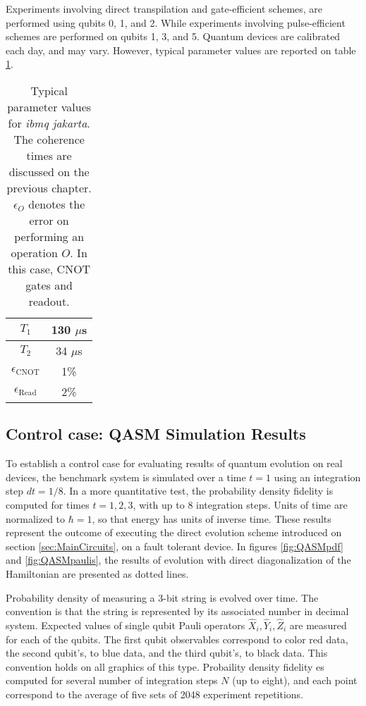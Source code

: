     Experiments involving direct transpilation and gate-efficient schemes, are performed using qubits 0, 1, and 2. While experiments involving pulse-efficient schemes are performed on qubits 1, 3, and 5. Quantum devices are calibrated each day, and may vary. However, typical parameter values are reported on table \ref{tab:jakartaParams}.

    \begin{table}[!htbp]
      \begin{center}
        \begin{tabular}{| c | c |}
          \hline 
          $T_1$ & 130 $\mu$s \\
          \hline
          $T_2$ & 34 $\mu$s \\
          \hline
          $\epsilon_{\text{CNOT}}$ & 1\% \\
          \hline
          $\epsilon_{\text{Read}}$ & 2\% \\
          \hline
        \end{tabular}
      \end{center}
      \caption{Typical parameter values for \textit{ibmq jakarta}. The coherence times are discussed on the previous chapter. $\epsilon_O$ denotes the error on performing an operation $O$. In this case, CNOT gates and readout.}
      \label{tab:jakartaParams}
    \end{table}
  
  \subsection{Control case: QASM Simulation Results}
  \label{subsec:QASMResults}

    To establish a control case for evaluating results of quantum evolution on real devices, the benchmark system is simulated over a time $t = 1$ using an integration step $dt = 1/8$. In a more quantitative test, the probability density fidelity is computed for times $t = 1, 2, 3$, with up to $8$ integration steps. Units of time are normalized to $\hbar = 1$, so that energy has units of inverse time. These results represent the outcome of executing the direct evolution scheme introduced on section \ref{sec:MainCircuits}, on a fault tolerant device. In figures \ref{fig:QASMpdf} and \ref{fig:QASMpaulis}, the results of evolution with direct diagonalization of the Hamiltonian are presented as dotted lines.

    Probability density of measuring a 3-bit string is evolved over time. The convention is that the string is represented by its associated number in decimal system. Expected values of single qubit Pauli operators $\hat{X}_i, \hat{Y}_i, \hat{Z}_i$ are measured for each of the qubits. The first qubit observables correspond to color red data, the second qubit's, to blue data, and the third qubit's, to black data. This convention holds on all graphics of this type. Probaility density fidelity es computed for several number of integration steps $N$ (up to eight), and each point correspond to the average of five sets of 2048 experiment repetitions.

